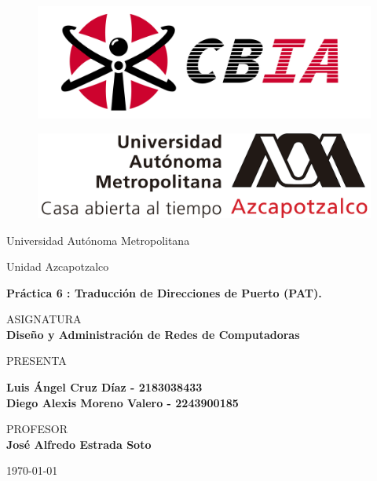 
\begin{figure}[ht]
    \centering %
    \begin{minipage}{0.45\textwidth} %
        \includegraphics[width=\textwidth]{img/portada/CBI.png}
        \label{CBI}
    \end{minipage}\hfill %
    \begin{minipage}{0.45\textwidth}
        \includegraphics[width=\textwidth]{img/portada/UAM.png}
        \label{UAM}
    \end{minipage}
\end{figure}


\begin{center}
\vspace{0.8cm}
\LARGE
Universidad Autónoma Metropolitana

\vspace{0.8cm}
\LARGE
Unidad Azcapotzalco

\vspace{1.7cm}
\Large
\textbf{Práctica 6 : Traducción de Direcciones de Puerto (PAT).}

\vspace{1.3cm}
\normalsize	
ASIGNATURA \\
\vspace{.3cm}
\large
\textbf{Diseño y Administración de Redes de Computadoras}

\vspace{1.3cm}
\normalsize
PRESENTA \\
\vspace{.3cm}
\large

\textbf{Luis Ángel Cruz Díaz - 2183038433\\}
\textbf{Diego Alexis Moreno Valero - 2243900185}

\vspace{1.3cm}
\normalsize	
PROFESOR \\
\vspace{.3cm}
\large
\textbf{José Alfredo Estrada Soto} 

\vspace{1.3cm}
\today
\end{center}

\thispagestyle{empty} 
\newpage
